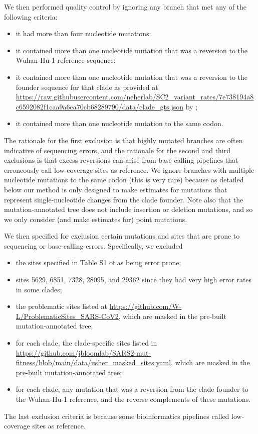 \documentclass[9pt,twocolumn,twoside]{gsajnl_modified}
\begin{document}
{We then performed quality control by ignoring any branch that met any of the following criteria:
\begin{itemize}
\item it had more than four nucleotide mutations;
\item it contained more than one nucleotide mutation that was a reversion to the Wuhan-Hu-1 reference sequence;
\item it contained more than one nucleotide mutation that was a reversion to the founder sequence for that clade as provided at \url{https://raw.githubusercontent.com/neherlab/SC2_variant_rates/7e738194a8c6592082f1caa9a6ca70cb68289790/data/clade_gts.json} by \cite{neher2022contributions};
\item it contained more than one nucleotide mutation to the same codon.
\end{itemize}
The rationale for the first exclusion is that highly mutated branches are often indicative of sequencing errors, and the rationale for the second and third exclusions is that excess reversions can arise from base-calling pipelines that erroneously call low-coverage sites as reference.
We ignore branches with multiple nucleotide mutations to the same codon (this is very rare) because as detailed below our method is only designed to make estimates for mutations that represent single-nucleotide changes from the clade founder.
Note also that the mutation-annotated tree does not include insertion or deletion mutations, and so we only consider (and make estimates for) point mutations.

We then specified for exclusion certain mutations and sites that are prone to sequencing or base-calling errors.
Specifically, we excluded
\begin{itemize}
\item the sites specified in Table S1 of \cite{turakhia2020stability} as being error prone;
\item sites 5629, 6851, 7328, 28095, and 29362 since they had very high error rates in some clades;
\item the problematic sites listed at \url{https://github.com/W-L/ProblematicSites_SARS-CoV2}, which are masked in the pre-built mutation-annotated tree;
\item for each clade, the clade-specific sites listed in \url{https://github.com/jbloomlab/SARS2-mut-fitness/blob/main/data/usher_masked_sites.yaml}, which are masked in the pre-built mutation-annotated tree;
\item for each clade, any mutation that was a reversion from the clade founder to the Wuhan-Hu-1 reference, and the reverse complements of these mutations.
\end{itemize}
The last exclusion criteria is because some bioinformatics pipelines called low-coverage sites as reference.

}
\end{document}
